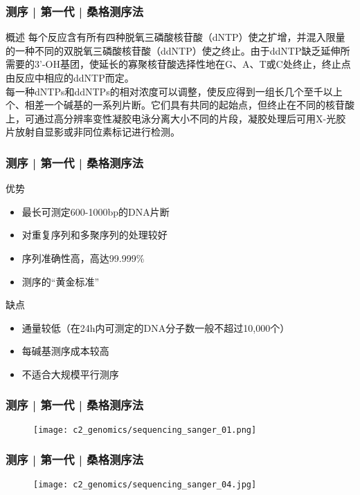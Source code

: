 \begin{frame}
  \frametitle{测序 | 第一代 | 桑格测序法}
  \begin{block}{概述}
    每个反应含有所有四种脱氧三磷酸核苷酸（dNTP）使之扩增，并混入限量的一种不同的双脱氧三磷酸核苷酸（ddNTP）使之终止。由于ddNTP缺乏延伸所需要的3'-OH基团，使延长的寡聚核苷酸选择性地在G、A、T或C处终止，终止点由反应中相应的ddNTP而定。\\
\vspace{1em}
每一种dNTPs和ddNTPs的相对浓度可以调整，使反应得到一组长几个至千以上个、相差一个碱基的一系列片断。它们具有共同的起始点，但终止在不同的核苷酸上，可通过高分辨率变性凝胶电泳分离大小不同的片段，凝胶处理后可用X-光胶片放射自显影或非同位素标记进行检测。
  \end{block}
\end{frame}

\begin{frame}
  \frametitle{测序 | 第一代 | 桑格测序法}
  \begin{block}{优势}
    \begin{itemize}
      \item 最长可测定600-1000bp的DNA片断
      \item 对重复序列和多聚序列的处理较好
      \item 序列准确性高，高达99.999\%
      \item 测序的“黄金标准”
    \end{itemize}
  \end{block}
  \pause
  \begin{block}{缺点}
    \begin{itemize}
      \item 通量较低（在24h内可测定的DNA分子数一般不超过10,000个）
      \item 每碱基测序成本较高
      \item 不适合大规模平行测序
    \end{itemize}
  \end{block}
\end{frame}

\begin{frame}
  \frametitle{测序 | 第一代 | 桑格测序法}
  \begin{figure}
    \centering
    \texttt{[image: c2\_genomics/sequencing\_sanger\_01.png]}
  \end{figure}
\end{frame}

\begin{frame}
  \frametitle{测序 | 第一代 | 桑格测序法}
  \begin{figure}
    \centering
    \texttt{[image: c2\_genomics/sequencing\_sanger\_04.jpg]}
  \end{figure}
\end{frame}

